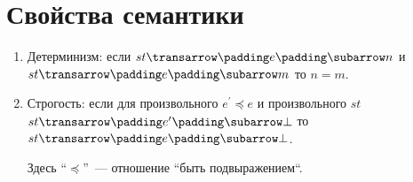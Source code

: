 \section{Свойства семантики}

\begin{enumerate}
\item Детерминизм: если $\trans{st}{e}{n}$ и $\trans{st}{e}{m}$ то $n=m$.

\item Строгость: если для произвольного $e^\prime\preceq e$ и произвольного $st$
$\trans{st}{e^\prime}{\bot}$ то $\trans{st}{e}{\bot}$.

  Здесь ``$\preceq$''~--- отношение ``быть подвыражением``.
\end{enumerate}
